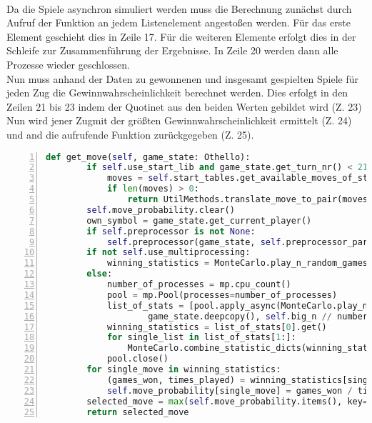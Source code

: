 \\Da die Spiele asynchron simuliert werden muss die Berechnung zunächst durch Aufruf der Funktion  an jedem Listenelement angestoßen werden. Für das erste Element geschieht dies in Zeile 17. Für die weiteren Elemente erfolgt dies in der Schleife zur Zusammenführung der Ergebnisse. In Zeile 20 werden dann alle Prozesse wieder geschlossen.
\\Nun muss anhand der Daten zu gewonnenen und insgesamt gespielten Spiele für jeden Zug die Gewinnwahrscheinlichkeit berechnet werden. Dies erfolgt in den Zeilen 21 bis 23 indem der Quotinet aus den beiden Werten gebildet wird (Z. 23)
\\Nun wird jener Zugmit der größten Gewinnwahrscheinlichkeit ermittelt (Z. 24) und and die aufrufende Funktion zurückgegeben (Z. 25).      
\begin{lstlisting}[caption = {get\_move Funktion des Monte-Carlo Agenten}, language = python, captionpos = t , numbers=left, label={lst:ab1}]
    def get_move(self, game_state: Othello):
        if self.use_start_lib and game_state.get_turn_nr() < 21: 
            moves = self.start_tables.get_available_moves_of_start_tables(game_state)
            if len(moves) > 0:
                return UtilMethods.translate_move_to_pair(moves[random.randrange(len(moves))])
        self.move_probability.clear()
        own_symbol = game_state.get_current_player()
        if self.preprocessor is not None:
            self.preprocessor(game_state, self.preprocessor_parameter, self.heuristic)
        if not self.use_multiprocessing:
            winning_statistics = MonteCarlo.play_n_random_games(own_symbol, game_state, self.big_n)
        else:
            number_of_processes = mp.cpu_count()
            pool = mp.Pool(processes=number_of_processes)
            list_of_stats = [pool.apply_async(MonteCarlo.play_n_random_games, args=(own_symbol, 
            		game_state.deepcopy(), self.big_n // number_of_processes)) for _ in range(number_of_processes)]
            winning_statistics = list_of_stats[0].get()
            for single_list in list_of_stats[1:]:
                MonteCarlo.combine_statistic_dicts(winning_statistics, single_list.get())
            pool.close()
        for single_move in winning_statistics:
            (games_won, times_played) = winning_statistics[single_move]
            self.move_probability[single_move] = games_won / times_played
        selected_move = max(self.move_probability.items(), key=operator.itemgetter(1))[0]
        return selected_move
\end{lstlisting}

